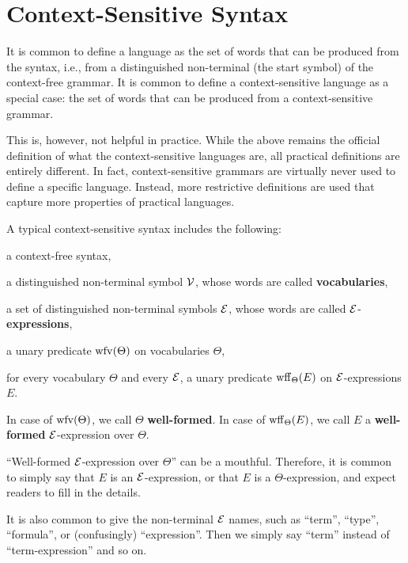\section{Context-Sensitive Syntax}

It is common to define a language as the set of words that can be produced from the syntax, i.e., from a distinguished non-terminal (the start symbol) of the context-free grammar.
It is common to define a context-sensitive language as a special case: the set of words that can be produced from a context-sensitive grammar.

This is, however, not helpful in practice.
While the above remains the official definition of what the context-sensitive languages are, all practical definitions are entirely different.
In fact, context-sensitive grammars are virtually never used to define a specific language.
Instead, more restrictive definitions are used that capture more properties of practical languages.

A typical context-sensitive syntax includes the following:
\begin{compactitem}
 \item a context-free syntax,
 \item a distinguished non-terminal symbol $\mathcal{V}$, whose words are called \textbf{vocabularies},
 \item a set of distinguished non-terminal symbols $\mathcal{E}$, whose words are called $\mathcal{E}$-\textbf{expressions},
 \item a unary predicate $\mathrm{wfv}(\Theta)$ on vocabularies $\Theta$,
 \item for every vocabulary $\Theta$ and every $\mathcal{E}$, a unary predicate $\mathrm{wff}_{\Theta}(E)$ on $\mathcal{E}$-expressions $E$.
\end{compactitem}
In case of $\mathrm{wfv}(\Theta)$, we call $\Theta$ \textbf{well-formed}.
In case of $\mathrm{wff}_{\Theta}(E)$, we call $E$ a \textbf{well-formed} $\mathcal{E}$-expression over $\Theta$.

\begin{remark}[Terminology]
``Well-formed $\mathcal{E}$-expression over $\Theta$'' can be a mouthful.
Therefore, it is common to simply say that $E$ is an $\mathcal{E}$-expression, or that $E$ is a $\Theta$-expression, and expect readers to fill in the details.

It is also common to give the non-terminal $\mathcal{E}$ names, such as ``term'', ``type'', ``formula'', or (confusingly) ``expression''.
Then we simply say ``term'' instead of ``term-expression'' and so on.
\end{remark}

